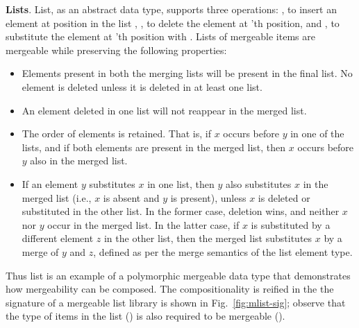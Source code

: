 

{\bf Lists}. List, as an abstract data type, supports three
operations: , to insert an element  at position
 in the list , , to delete the element at
'th position, and , to substitute the element at
'th position with . Lists of mergeable items are mergeable
while preserving the following properties:
\begin{itemize}
  \item Elements present in both the merging lists will be present in
  the final list. No element is deleted unless it is deleted in at
  least one list.
  \item An element deleted in one list will not reappear in the merged
  list.
  \item The order of elements is retained. That is, if $x$ occurs
  before $y$ in one of the lists, and if both elements are present in
  the merged list, then $x$ occurs before $y$ also in the merged list.
  \item If an element $y$ substitutes $x$ in one list, then $y$ also
  substitutes $x$ in the merged list (i.e., $x$ is absent and $y$ is
  present), unless $x$ is deleted or substituted in the other list. In
  the former case, deletion wins, and neither $x$ nor $y$ occur in the
  merged list. In the latter case, if $x$ is substituted by a
  different element $z$ in the other list, then the merged list
  substitutes $x$ by a merge of $y$ and $z$, defined as per the merge
  semantics of the list element type.
\end{itemize}
Thus list is an example of a polymorphic mergeable data type that
demonstrates how mergeability can be composed. The compositionality is
reified in the the signature of a mergeable list library is shown in
Fig.~\ref{fig:mlist-sig}; observe that the type of items in the list
() is also required to be mergeable (). 

